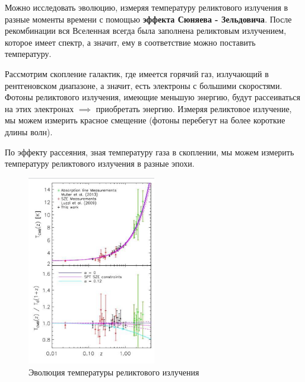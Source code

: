  Можно исследовать эволюцию, измеряя температуру реликтового излучения в разные моменты времени с помощью \textbf{эффекта Сюняева - Зельдовича}.
 После рекомбинации вся Вселенная всегда была заполнена реликтовым излучением, которое имеет спектр, а значит, ему в соответствие можно поставить температуру.
 
 Рассмотрим скопление галактик, где имеется горячий газ, излучающий в рентгеновском диапазоне, а значит, есть электроны с большими скоростями. Фотоны реликтового излучения, имеющие меньшую энергию, будут рассеиваться на этих электронах $\implies$ приобретать энергию. Измеряя реликтовое излучение, мы можем измерить красное смещение (фотоны перебегут на более короткие длины волн). 
 
 По эффекту рассеяния, зная температуру газа в скоплении, мы можем измерить температуру реликтового излучения в разные эпохи.
 
 \begin{figure}
  \centering
    \includegraphics[width=0.5\textwidth]{Pictures/19_imdone.png}
  \caption{Эволюция температуры реликтового излучения}
  \label{fig:19_done}
 \end{figure}